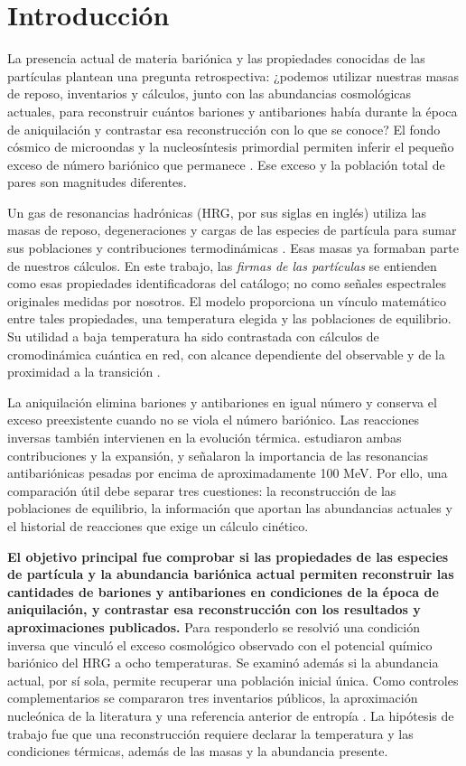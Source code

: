 \section{Introducción}
La presencia actual de materia bariónica y las propiedades conocidas de las partículas plantean una pregunta retrospectiva: ¿podemos utilizar nuestras masas de reposo, inventarios y cálculos, junto con las abundancias cosmológicas actuales, para reconstruir cuántos bariones y antibariones había durante la época de aniquilación y contrastar esa reconstrucción con lo que se conoce? El fondo cósmico de microondas y la nucleosíntesis primordial permiten inferir el pequeño exceso de número bariónico que permanece \citep{Fields2025,Planck2020}. Ese exceso y la población total de pares son magnitudes diferentes.

Un gas de resonancias hadrónicas (HRG, por sus siglas en inglés) utiliza las masas de reposo, degeneraciones y cargas de las especies de partícula para sumar sus poblaciones y contribuciones termodinámicas \citep{Vovchenko2019}. Esas masas ya formaban parte de nuestros cálculos. En este trabajo, las \emph{firmas de las partículas} se entienden como esas propiedades identificadoras del catálogo; no como señales espectrales originales medidas por nosotros. El modelo proporciona un vínculo matemático entre tales propiedades, una temperatura elegida y las poblaciones de equilibrio. Su utilidad a baja temperatura ha sido contrastada con cálculos de cromodinámica cuántica en red, con alcance dependiente del observable y de la proximidad a la transición \citep{Bazavov2012}.

La aniquilación elimina bariones y antibariones en igual número y conserva el exceso preexistente cuando no se viola el número bariónico. Las reacciones inversas también intervienen en la evolución térmica. \citet{Satarov2013} estudiaron ambas contribuciones y la expansión, y señalaron la importancia de las resonancias antibariónicas pesadas por encima de aproximadamente 100 MeV. Por ello, una comparación útil debe separar tres cuestiones: la reconstrucción de las poblaciones de equilibrio, la información que aportan las abundancias actuales y el historial de reacciones que exige un cálculo cinético.

\textbf{El objetivo principal fue comprobar si las propiedades de las especies de partícula y la abundancia bariónica actual permiten reconstruir las cantidades de bariones y antibariones en condiciones de la época de aniquilación, y contrastar esa reconstrucción con los resultados y aproximaciones publicados.} Para responderlo se resolvió una condición inversa que vinculó el exceso cosmológico observado con el potencial químico bariónico del HRG a ocho temperaturas. Se examinó además si la abundancia actual, por sí sola, permite recuperar una población inicial única. Como controles complementarios se compararon tres inventarios públicos, la aproximación nucleónica de la literatura y una referencia anterior de entropía \citep{Garcia2026}. La hipótesis de trabajo fue que una reconstrucción requiere declarar la temperatura y las condiciones térmicas, además de las masas y la abundancia presente.

